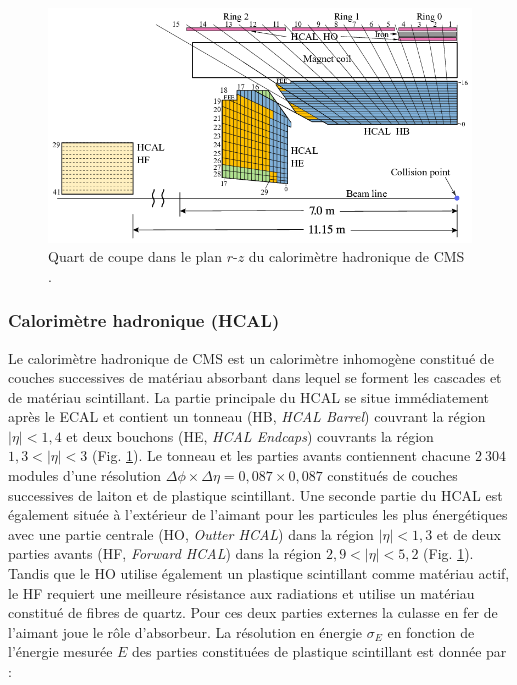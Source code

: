 \begin{figure}
\centering
    \includegraphics[scale=0.5]{Chapitre3/Images/HCAL.png} 
\caption{Quart de coupe dans le plan $r$-$z$ du calorimètre hadronique de CMS \cite{HCAL}.}
\label{hcal}
\end{figure}

\subsubsection{ Calorimètre hadronique (HCAL)}

Le calorimètre hadronique de CMS est un calorimètre inhomogène constitué de couches successives de matériau absorbant dans lequel se forment les cascades et de matériau scintillant. La partie principale du HCAL se situe immédiatement après le ECAL et contient un tonneau (HB, \textit{HCAL Barrel}) couvrant la région $|\eta|<1,4$ et deux bouchons (HE, \textit{HCAL Endcaps}) couvrants la région $1,3<|\eta|<3$ (Fig. \ref{hcal}). Le tonneau et les parties avants contiennent chacune $2~304$ modules d'une résolution $\Delta\phi\times\Delta\eta=0,087\times0,087$ constitués de couches successives de laiton et de plastique scintillant. Une seconde partie du HCAL est également située à l'extérieur de l'aimant pour les particules les plus énergétiques avec une partie centrale (HO, \textit{Outter HCAL}) dans la région $|\eta|<1,3$ et de deux parties avants (HF, \textit{Forward HCAL}) dans la région $2,9<|\eta|<5,2$ (Fig. \ref{hcal}). Tandis que le HO utilise également un plastique scintillant comme matériau actif, le HF requiert une meilleure résistance aux radiations et utilise un matériau constitué de fibres de quartz. Pour ces deux parties externes la culasse en fer de l'aimant joue le rôle d'absorbeur. La résolution en énergie $\sigma_E$ en fonction de l'énergie mesurée $E$ des parties constituées de plastique scintillant est donnée par :

